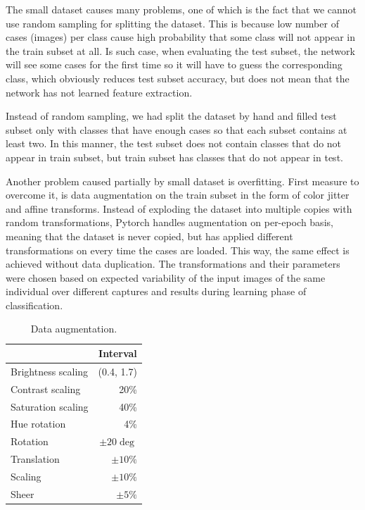 \documentclass[fleqn,moreauthors,10pt]{ds_report}
\begin{document}
The small dataset causes many problems, one of which is the fact that we cannot use random sampling for splitting the dataset. This is because low number of cases (images) per class cause high probability that some class will not appear in the train subset at all. Is such case, when evaluating the test subset, the network will see some cases for the first time so it will have to guess the corresponding class, which obviously reduces test subset accuracy, but does not mean that the network has not learned feature extraction.

Instead of random sampling, we had split the dataset by hand and filled test subset only with classes that have enough cases so that each subset contains at least two. In this manner, the test subset does not contain classes that do not appear in train subset, but train subset has classes that do not appear in test.

Another problem caused partially by small dataset is overfitting. First measure to overcome it, is data augmentation on the train subset in the form of color jitter and affine transforms. Instead of exploding the dataset into multiple copies with random transformations, Pytorch handles augmentation on per-epoch basis, meaning that the dataset is never copied, but has applied different transformations on every time the cases are loaded. This way, the same effect is achieved without data duplication. The transformations and their parameters were chosen based on expected variability of the input images of the same individual over different captures and results during learning phase of classification.

\begin{table}[hbt]
	\caption{Data augmentation.}
	\centering
	\begin{tabular}{l | r }
		\toprule
		\cmidrule(r){1-1}
		                   & Interval     \\
		\midrule
		Brightness scaling & (0.4, 1.7)   \\
		Contrast scaling   & 20\%         \\
		Saturation scaling & 40\%         \\
		Hue rotation       & 4\%          \\
		Rotation           & $\pm20\deg$  \\
		Translation        & $\pm10\%$    \\
		Scaling            & $\pm10\%$    \\
		Sheer              & $\pm5\%$     \\
		\bottomrule
	\end{tabular}
	\label{tab:augmentation}
\end{table}
\end{document}
